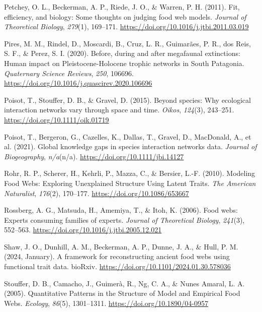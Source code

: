 \documentclass[
]{agujournal2019}
\newlength{\cslhangindent}
\newenvironment{CSLReferences}[2] %
 {\begin{list}{}{%
  \setlength{\itemindent}{0pt}
  \setlength{\leftmargin}{0pt}
  \setlength{\parsep}{0pt}
  \ifodd #1
   \setlength{\leftmargin}{\cslhangindent}
   \setlength{\itemindent}{-1\cslhangindent}
  \fi
  \setlength{\itemsep}{#2\baselineskip}}}
 {\end{list}}
\begin{document}
\begin{CSLReferences}{1}{0}
Petchey, O. L., Beckerman, A. P., Riede, J. O., \& Warren, P. H. (2011).
Fit, efficiency, and biology: {Some} thoughts on judging food web
models. \emph{Journal of Theoretical Biology}, \emph{279}(1), 169--171.
\url{https://doi.org/10.1016/j.jtbi.2011.03.019}

Pires, M. M., Rindel, D., Moscardi, B., Cruz, L. R., Guimarães, P. R.,
dos Reis, S. F., \& Perez, S. I. (2020). Before, during and after
megafaunal extinctions: {Human} impact on {Pleistocene-Holocene} trophic
networks in {South Patagonia}. \emph{Quaternary Science Reviews},
\emph{250}, 106696.
\url{https://doi.org/10.1016/j.quascirev.2020.106696}

Poisot, T., Stouffer, D. B., \& Gravel, D. (2015). Beyond species: Why
ecological interaction networks vary through space and time.
\emph{Oikos}, \emph{124}(3), 243--251.
\url{https://doi.org/10.1111/oik.01719}

Poisot, T., Bergeron, G., Cazelles, K., Dallas, T., Gravel, D.,
MacDonald, A., et al. (2021). Global knowledge gaps in species
interaction networks data. \emph{Journal of Biogeography},
\emph{n/a}(n/a). \url{https://doi.org/10.1111/jbi.14127}

Rohr, R. P., Scherer, H., Kehrli, P., Mazza, C., \& Bersier, L.-F.
(2010). Modeling {Food Webs}: {Exploring Unexplained Structure Using
Latent Traits}. \emph{The American Naturalist}, \emph{176}(2), 170--177.
\url{https://doi.org/10.1086/653667}

Rossberg, A. G., Matsuda, H., Amemiya, T., \& Itoh, K. (2006). Food
webs: {Experts} consuming families of experts. \emph{Journal of
Theoretical Biology}, \emph{241}(3), 552--563.
\url{https://doi.org/10.1016/j.jtbi.2005.12.021}

Shaw, J. O., Dunhill, A. M., Beckerman, A. P., Dunne, J. A., \& Hull, P.
M. (2024, January). A framework for reconstructing ancient food webs
using functional trait data. {bioRxiv}.
\url{https://doi.org/10.1101/2024.01.30.578036}

Stouffer, D. B., Camacho, J., Guimerà, R., Ng, C. A., \& Nunes Amaral,
L. A. (2005). Quantitative {Patterns} in the {Structure} of {Model} and
{Empirical Food Webs}. \emph{Ecology}, \emph{86}(5), 1301--1311.
\url{https://doi.org/10.1890/04-0957}


\end{CSLReferences}
\end{document}
